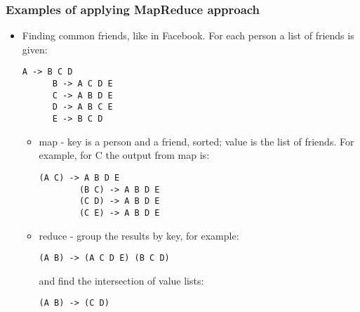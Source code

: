 \documentclass{beamer}
\begin{document}
\begin{frame}[fragile]
  \frametitle{Examples of applying MapReduce approach}
  \begin{itemize}
  \item {\color{mycolordef}Finding common friends, like in Facebook. } For each person a list of friends is given:
    \begin{lstlisting}[frame=single, basicstyle=\tiny]
      A -> B C D
      B -> A C D E
      C -> A B D E
      D -> A B C E
      E -> B C D
    \end{lstlisting}
    
    \begin{itemize}
    \item map - key is a person and a friend, sorted; value is the list of friends. For example, for C the output from map is:
      \begin{lstlisting}[frame=single, basicstyle=\tiny]
        (A C) -> A B D E
        (B C) -> A B D E
        (C D) -> A B D E
        (C E) -> A B D E
      \end{lstlisting}
    \item reduce - group the results by key, for example:
      \begin{lstlisting}[frame=single, basicstyle=\tiny]
        (A B) -> (A C D E) (B C D)
      \end{lstlisting}
      and find the intersection of value lists:
      \begin{lstlisting}[frame=single, basicstyle=\tiny]
        (A B) -> (C D)
      \end{lstlisting}
    \end{itemize}
  \end{itemize}
\end{frame}
\end{document}
